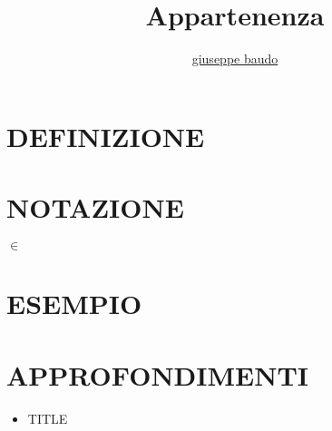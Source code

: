 \documentclass[a4paper,10pt]{article}
\title{Appartenenza}
\author{\href{http://www.baudo.hol.es}{giuseppe baudo}}
\begin{document}
\maketitle

\section{DEFINIZIONE}

\section{NOTAZIONE}
$\in$
\section{ESEMPIO}

\section{APPROFONDIMENTI}
\begin{itemize}
 \item TITLE
\end{itemize}
\end{document}
